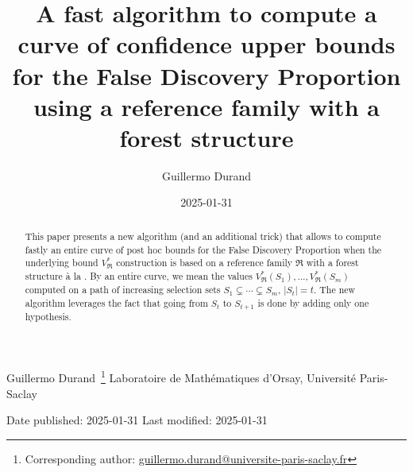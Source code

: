 \documentclass[
  11pt,
  a4paper,
]{article}
\title{A fast algorithm to compute a curve of confidence upper bounds
for the False Discovery Proportion using a reference family with a
forest structure}
\author{Guillermo Durand}
\date{2025-01-31}
\theoremstyle{plain}
\theoremstyle{plain}
\theoremstyle{plain}
\theoremstyle{definition}
\theoremstyle{definition}
\theoremstyle{remark}
\begin{document}


\vspace*{2.5cm}
\begin{center}
          Guillermo
Durand~\footnote{Corresponding author: \href{mailto:guillermo.durand@universite-paris-saclay.fr}{guillermo.durand@universite-paris-saclay.fr}}\quad
             Laboratoire de Mathématiques d'Orsay, Université
Paris-Saclay\\
           
  \bigskip
  
  Date published: 2025-01-31 \quad Last modified: 2025-01-31
\end{center}
      
\bigskip
\begin{abstract}
This paper presents a new algorithm (and an additional trick) that
allows to compute fastly an entire curve of post hoc bounds for the
False Discovery Proportion when the underlying bound
\(V^*_{\mathfrak{R}}\) construction is based on a reference family
\(\mathfrak{R}\) with a forest structure à la \citet{MR4178188}. By an
entire curve, we mean the values
\(V^*_{\mathfrak{R}}(S_1),\dotsc,V^*_{\mathfrak{R}}(S_m)\) computed on a
path of increasing selection sets \(S_1\subsetneq\dotsb\subsetneq S_m\),
\(|S_t|=t\). The new algorithm leverages the fact that going from
\(S_t\) to \(S_{t+1}\) is done by adding only one hypothesis.
\end{abstract}
\end{document}
